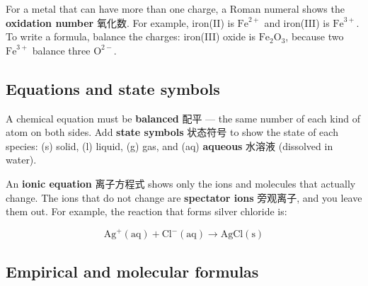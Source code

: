 \documentclass[11pt]{article}
\begin{document}
\begin{center}
\end{center}

For a metal that can have more than one charge, a Roman numeral shows the \textbf{oxidation number} 氧化数. For example, iron(II) is $\text{Fe}^{2+}$ and iron(III) is $\text{Fe}^{3+}$. To write a formula, balance the charges: iron(III) oxide is $\text{Fe}_2\text{O}_3$, because two $\text{Fe}^{3+}$ balance three $\text{O}^{2-}$.

\subsection*{Equations and state symbols}

A chemical equation must be \textbf{balanced} 配平 — the same number of each kind of atom on both sides. Add \textbf{state symbols} 状态符号 to show the state of each species: (s) solid, (l) liquid, (g) gas, and (aq) \textbf{aqueous} 水溶液 (dissolved in water).

An \textbf{ionic equation} 离子方程式 shows only the ions and molecules that actually change. The ions that do not change are \textbf{spectator ions} 旁观离子, and you leave them out. For example, the reaction that forms silver chloride is:

\[
\text{Ag}^{+}(\text{aq}) + \text{Cl}^{-}(\text{aq}) \rightarrow \text{AgCl}(\text{s})
\]

\subsection*{Empirical and molecular formulas}
\end{document}

